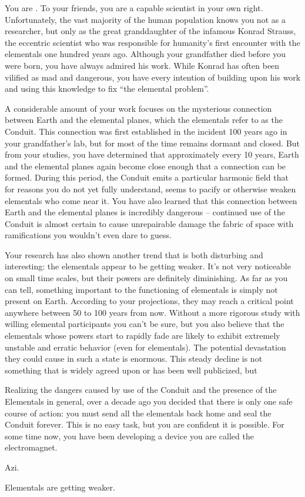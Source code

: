\documentclass[char]{guildcamp1}
\begin{document}
\name{\cGD{}}

You are \cGD{\intro}. To your friends, you are a capable scientist in your own right. Unfortunately, the vast majority of the human population knows you not as a researcher, but only as the great granddaughter of the infamous Konrad Strauss, the eccentric scientist who was responsible for humanity's first encounter with the elementals one hundred years ago. Although your grandfather died before you were born, you have always admired his work. While Konrad has often been vilified as mad and dangerous, you have every intention of building upon his work and using this knowledge to fix ``the elemental problem''.

A considerable amount of your work focuses on the mysterious connection between Earth and the elemental planes, which the elementals refer to as the Conduit. This connection was first established in the incident 100 years ago in your grandfather's lab, but for most of the time remains dormant and closed. But from your studies, you have determined that approximately every 10 years, Earth and the elemental planes again become close enough that a connection can be formed. During this period, the Conduit emits a particular harmonic field that for reasons you do not yet fully understand, seems to pacify or otherwise weaken elementals who come near it. You have also learned that this connection between Earth and the elemental planes is incredibly dangerous -- continued use of the Conduit is almost certain to cause unrepairable damage the fabric of space with ramifications you wouldn't even dare to guess.

Your research has also shown another trend that is both disturbing and interesting: the elementals appear to be getting weaker. It's not very noticeable on small time scales, but their powers are definitely diminishing. As far as you can tell, something important to the functioning of elementals is simply not present on Earth. According to your projections, they may reach a critical point anywhere between 50 to 100 years from now. Without a more rigorous study with willing elemental participants you can't be sure, but you also believe that the elementals whose powers start to rapidly fade are likely to exhibit extremely unstable and erratic behavior (even for elementals). The potential devastation they could cause in such a state is enormous. This steady decline is not something that is widely agreed upon or has been well publicized, but 

Realizing the dangers caused by use of the Conduit and the presence of the Elementals in general, over a decade ago you decided that there is only one safe course of action: you must send all the elementals back home and seal the Conduit forever. This is no easy task, but you are confident it is possible. For some time now, you have been developing a device you are called the electromagnet.

Azi.

Elementals are getting weaker.
\end{document}
